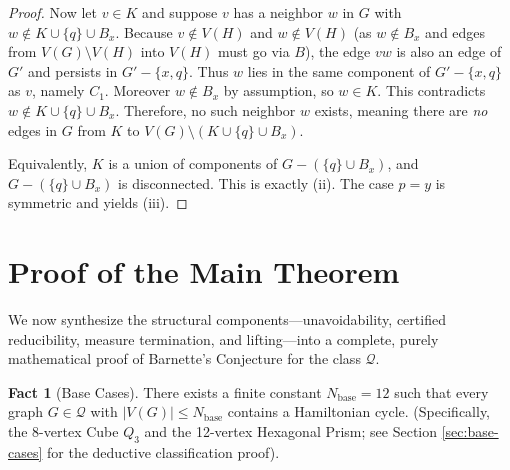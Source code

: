 \documentclass[12pt]{article}
\theoremstyle{definition}
\newtheorem{fact}[theorem]{Fact}
\begin{document}
\begin{proof}
Now let $v\in K$ and suppose $v$ has a neighbor $w$ in $G$ with
$w\notin K\cup\{q\}\cup B_x$.
Because $v\notin V(H)$ and $w\notin V(H)$ (as $w\notin B_x$ and edges from $V(G)\setminus V(H)$ into $V(H)$
must go via $B$), the edge $vw$ is also an edge of $G'$ and persists in $G'-\{x,q\}$.
Thus $w$ lies in the same component of $G'-\{x,q\}$ as $v$, namely $C_1$.
Moreover $w\notin B_x$ by assumption, so $w\in K$.
This contradicts $w\notin K\cup\{q\}\cup B_x$.
Therefore, no such neighbor $w$ exists, meaning there are \emph{no} edges in $G$ from $K$ to
$V(G)\setminus (K\cup\{q\}\cup B_x)$.

Equivalently, $K$ is a union of components of $G-(\{q\}\cup B_x)$, and $G-(\{q\}\cup B_x)$ is disconnected.
This is exactly (ii). The case $p=y$ is symmetric and yields (iii).
\end{proof}



\section{Proof of the Main Theorem}
\label{sec:main-theorem}

We now synthesize the structural components---unavoidability, certified reducibility, measure termination, and lifting---into a complete, purely mathematical proof of Barnette's Conjecture for the class $\mathcal{Q}$.

\begin{fact}[Base Cases]
\label{fact:base-cases}
There exists a finite constant $N_{\mathrm{base}} = 12$ such that every graph $G \in \mathcal{Q}$ with $|V(G)| \le N_{\mathrm{base}}$ contains a Hamiltonian cycle. (Specifically, the 8-vertex Cube $Q_3$ and the 12-vertex Hexagonal Prism; see Section \ref{sec:base-cases} for the deductive classification proof).
\end{fact}
\end{document}
